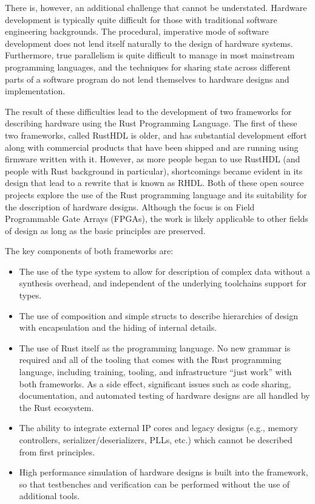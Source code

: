 \documentclass[conference]{IEEEtran}
\begin{document}
There is, however, an additional challenge that cannot be understated.  Hardware development
is typically quite difficult for those with traditional software engineering backgrounds.
The procedural, imperative mode of software development does not lend itself naturally to
the design of hardware systems.  Furthermore, true parallelism is quite difficult to manage in
most mainstream programming languages, and the techniques for sharing state across different
parts of a software program do not lend themselves to hardware designs and implementation.

The result of these difficulties lead to the development of two frameworks for describing
hardware using the Rust Programming Language.  The first of these two frameworks, called
RustHDL is older, and has substantial development effort along with commercial products
that have been shipped and are running using firmware written with it.  However, as more
people began to use RustHDL (and people with Rust background in particular), shortcomings
became evident in its design that lead to a rewrite that is known as RHDL.  Both of
these open source projects explore the use of the Rust programming language and its
suitability for the description of hardware designs.  Although the focus is on Field Programmable
Gate Arrays (FPGAs), the work is likely applicable to other fields of design as long as
the basic principles are preserved.

The key components of both frameworks are:
\begin{itemize}
\item The use of the type system to allow for description of complex data without
  a synthesis overhead, and independent of the underlying toolchains support for
  types.
\item The use of composition and simple structs to describe hierarchies of design
  with encapsulation and the hiding of internal details.
\item The use of Rust itself as the programming language.  No new grammar is required
  and all of the tooling that comes with the Rust programming language, including training,
  tooling, and infrastructure ``just work'' with both frameworks.  As a side effect,
  significant issues such as code sharing, documentation, and automated testing of hardware designs 
  are all handled by the Rust ecosystem.
\item The ability to integrate external IP cores and legacy designs (e.g., memory controllers,
  serializer/deserializers, PLLs, etc.) which cannot be described from first principles.
\item High performance simulation of hardware designs is built into the framework, so that
  testbenches and verification can be performed without the use of additional tools.
\end{itemize}
\end{document}
